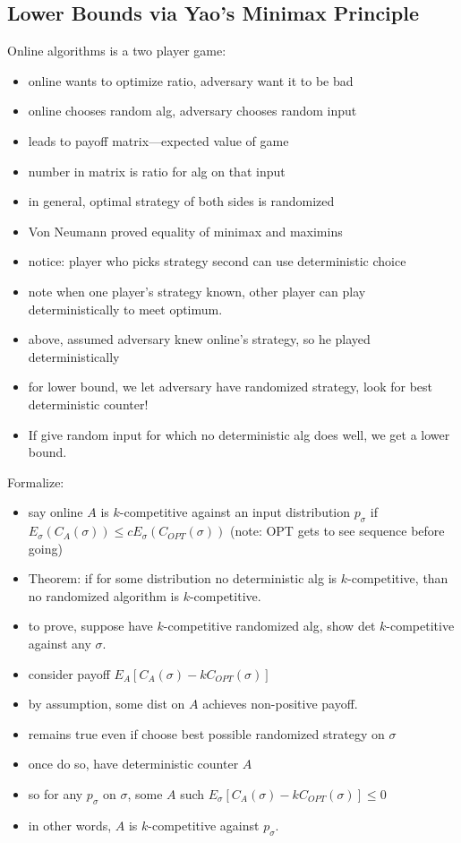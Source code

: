 \documentclass{article}
\begin{document}
\subsection*{Lower Bounds via Yao's Minimax Principle}


Online algorithms is a two player game:
\begin{itemize}
\item online wants to optimize ratio, adversary want it to be bad
\item online chooses random alg, adversary chooses random input
\item leads to payoff matrix---expected value of game
\item number in matrix is ratio for alg on that input
\item in general, optimal strategy of both sides is randomized
\item Von Neumann proved equality of minimax and maximins
\item notice: player who picks strategy second can use deterministic
  choice
\item note when one player's strategy known, other player can play
  deterministically to meet optimum.
\item above, assumed adversary knew online's strategy, so he played
  deterministically
\item for lower bound, we let adversary have randomized strategy, look
  for best deterministic counter!
\item If give random input for which no deterministic alg does well,
  we get a lower bound.
\end{itemize}

Formalize:
\begin{itemize}
\item say online $A$ is $k$-competitive against an input distribution
  $p_\sigma$ if $E_\sigma(C_A(\sigma)) \le
  cE_\sigma(C_{OPT}(\sigma))$ (note: OPT gets to see sequence before
  going)
\item Theorem: if for some distribution no deterministic alg is
  $k$-competitive, than no randomized algorithm is $k$-competitive.  
\item to prove, suppose have $k$-competitive randomized alg, show det
  $k$-competitive against any $\sigma$.
\item consider payoff $E_{A} [C_A(\sigma) - kC_{OPT}(\sigma)]$
\item by assumption, some dist on $A$ achieves non-positive payoff.
\item remains true even if choose best possible randomized strategy on
  $\sigma$ 
\item once do so, have deterministic counter $A$
\item so for any $p_\sigma$ on $\sigma$, some $A$ such
  $E_{\sigma}[C_A(\sigma)-kC_{OPT}(\sigma)] \le 0$
\item in other words, $A$ is $k$-competitive against $p_\sigma$.
\end{itemize}
\end{document}
